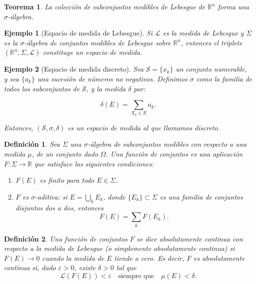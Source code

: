 \documentclass{report}
\newtheorem{thm}{Teorema}[section]
\newtheorem{dfn}{Definición}[section]
\newtheorem{ej}{Ejemplo}[section]
\begin{document}
\begin{thm}
La colección de subconjuntos medibles de Lebesgue de \( \mathbb{R}^n \) forma una \( \sigma \)-álgebra.
\end{thm}


\begin{ej}[Espacio de medida de Lebesgue]
Si \( \mathscr{L}\) es la medida de Lebesgue y \( \Sigma \) es la \(\sigma\)-álgebra de conjuntos medibles de Lebesgue sobre \( \mathbb{R}^n \),
entonces el triplete \( (\mathbb{R}^n, \Sigma, \mathscr{L}) \) constituye un \textit{espacio de medida}.
\end{ej}

\begin{ej}[Espacio de medida discreto]
Sea \( \mathcal{S} = \{x_k\} \) un conjunto numerable, y sea \( \{a_k\} \) una sucesión de números no negativos.
Definimos \( \sigma \) como la familia de todos los subconjuntos de \( \mathcal{S} \), y la medida \( \delta \) por:

\[
\delta(E) = \sum_{X_k \in E} a_k.
\]

Entonces, \( (\mathcal{S}, \sigma, \delta) \) es un espacio de medida al que llamamos \emph{discreto}.
\end{ej}

\begin{dfn}
Sea \( \Sigma \) una \( \sigma \)-álgebra de subconjuntos medibles con respecto a una medida $\mu$, de un conjunto dado \( \Omega \).
Una \emph{función de conjuntos} es una aplicación \( F: \Sigma \to \mathbb{R} \) que satisface las siguientes condiciones:
\begin{enumerate}
    \item \( F(E) \) es finito para todo \( E \in \Sigma \).
    \item \( F \) es \(\sigma\)-aditiva: si \( E = \bigcup_k E_k \), donde \( \{E_k\} \subset \Sigma \) es una familia de conjuntos disjuntos dos a dos, entonces
    \[
        F(E) = \sum_k F(E_k).
    \]
\end{enumerate}
\end{dfn}

\begin{dfn}
Una función de conjuntos \( F \) se dice \emph{absolutamente continua con respecto a la medida de Lebesgue} (o simplemente \emph{absolutamente continua})
 si \( F(E) \to 0 \) cuando la medida de \( E \) tiende a cero. Es decir, \( F \) es absolutamente continua si, dado \( \varepsilon > 0 \), existe \( \delta > 0 \) tal que
\[
\mathcal{L}(F(E)) < \varepsilon \quad \text{siempre que} \quad \mu(E) < \delta.
\]
\end{dfn}
\end{document}
